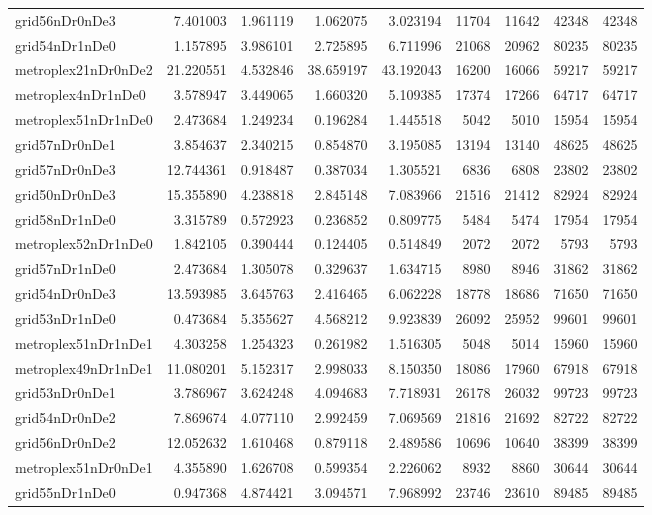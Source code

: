 \begin{longtable}{|l|r|r|r|r|r|r|r|r|}
grid56nDr0nDe3 & 7.401003 & 1.961119 & 1.062075 & 3.023194 & 11704 & 11642 & 42348 & 42348 \\
grid54nDr1nDe0 & 1.157895 & 3.986101 & 2.725895 & 6.711996 & 21068 & 20962 & 80235 & 80235 \\
metroplex21nDr0nDe2 & 21.220551 & 4.532846 & 38.659197 & 43.192043 & 16200 & 16066 & 59217 & 59217 \\
metroplex4nDr1nDe0 & 3.578947 & 3.449065 & 1.660320 & 5.109385 & 17374 & 17266 & 64717 & 64717 \\
metroplex51nDr1nDe0 & 2.473684 & 1.249234 & 0.196284 & 1.445518 & 5042 & 5010 & 15954 & 15954 \\
grid57nDr0nDe1 & 3.854637 & 2.340215 & 0.854870 & 3.195085 & 13194 & 13140 & 48625 & 48625 \\
grid57nDr0nDe3 & 12.744361 & 0.918487 & 0.387034 & 1.305521 & 6836 & 6808 & 23802 & 23802 \\
grid50nDr0nDe3 & 15.355890 & 4.238818 & 2.845148 & 7.083966 & 21516 & 21412 & 82924 & 82924 \\
grid58nDr1nDe0 & 3.315789 & 0.572923 & 0.236852 & 0.809775 & 5484 & 5474 & 17954 & 17954 \\
metroplex52nDr1nDe0 & 1.842105 & 0.390444 & 0.124405 & 0.514849 & 2072 & 2072 & 5793 & 5793 \\
grid57nDr1nDe0 & 2.473684 & 1.305078 & 0.329637 & 1.634715 & 8980 & 8946 & 31862 & 31862 \\
grid54nDr0nDe3 & 13.593985 & 3.645763 & 2.416465 & 6.062228 & 18778 & 18686 & 71650 & 71650 \\
grid53nDr1nDe0 & 0.473684 & 5.355627 & 4.568212 & 9.923839 & 26092 & 25952 & 99601 & 99601 \\
metroplex51nDr1nDe1 & 4.303258 & 1.254323 & 0.261982 & 1.516305 & 5048 & 5014 & 15960 & 15960 \\
metroplex49nDr1nDe1 & 11.080201 & 5.152317 & 2.998033 & 8.150350 & 18086 & 17960 & 67918 & 67918 \\
grid53nDr0nDe1 & 3.786967 & 3.624248 & 4.094683 & 7.718931 & 26178 & 26032 & 99723 & 99723 \\
grid54nDr0nDe2 & 7.869674 & 4.077110 & 2.992459 & 7.069569 & 21816 & 21692 & 82722 & 82722 \\
grid56nDr0nDe2 & 12.052632 & 1.610468 & 0.879118 & 2.489586 & 10696 & 10640 & 38399 & 38399 \\
metroplex51nDr0nDe1 & 4.355890 & 1.626708 & 0.599354 & 2.226062 & 8932 & 8860 & 30644 & 30644 \\
grid55nDr1nDe0 & 0.947368 & 4.874421 & 3.094571 & 7.968992 & 23746 & 23610 & 89485 & 89485 \\

\end{longtable}
